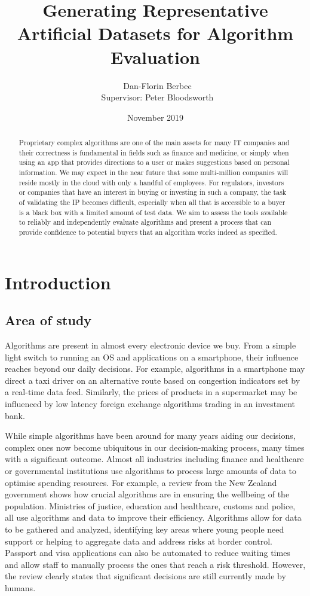 \documentclass[proposal]{softeng}
\title{Generating Representative Artificial Datasets for Algorithm Evaluation}
\author{\ Dan-Florin Berbec \\ \ Supervisor: Peter Bloodsworth}
\date{November 2019}
\begin{document}
\maketitle

\newpage
\clearpage\mbox{}\clearpage

\begin{abstract}
Proprietary complex algorithms are one of the main assets for many IT companies and their correctness is fundamental in fields such as finance and medicine, or simply when using an app that provides directions to a user or makes suggestions based on personal information. We may expect in the near future that some multi-million companies will reside mostly in the cloud with only a handful of employees. For regulators, investors or companies that have an interest in buying or investing in such a company, the task of validating the IP becomes difficult, especially when all that is accessible to a buyer is a black box with a limited amount of test data. We aim to assess the tools available to reliably and independently evaluate algorithms and present a process that can provide confidence to potential buyers that an algorithm works indeed as specified.\end{abstract}
 
\section{ Introduction}
\subsection{Area of study}

Algorithms are present in almost every electronic device we buy. From a simple light switch to running an OS and applications on a smartphone, their influence reaches beyond our daily decisions. For example, algorithms in a smartphone may direct a taxi driver on an alternative route based on congestion indicators set by a real-time data feed. Similarly, the prices of products in a supermarket may be influenced by low latency foreign exchange algorithms trading in an investment bank.

While simple algorithms have been around for many years aiding our decisions, complex ones now become ubiquitous in our decision-making process, many times with a significant outcome. Almost all industries including finance and healthcare or governmental institutions use algorithms to process large amounts of data to optimise spending resources. For example, a review\cite{algassessment} from the New Zealand government shows how crucial algorithms are in ensuring the wellbeing of the population. Ministries of justice, education and healthcare, customs and police, all use algorithms and data to improve their efficiency. Algorithms allow for data to be gathered and analyzed, identifying key areas where young people need support or helping to aggregate data and address risks at border control. Passport and visa applications can also be automated to reduce waiting times and allow staff to manually process the ones that reach a risk threshold. However, the review clearly states that significant decisions are still currently made by humans. 
\end{document}
